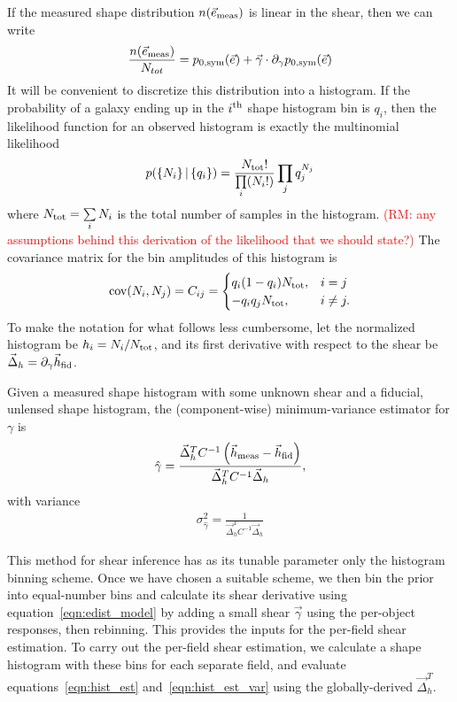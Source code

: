 \documentclass[iop]{emulateapj}
\newcommand\rmcomment[1]{\textcolor{red}{(RM: #1)}}
\begin{document}
If the measured shape distribution $n(\vec{e}_{\rm meas})$ is linear
in the shear, then we can write
\begin{align}
\frac{n(\vec{e}_{\rm meas})}{N_{tot}} = p_{0,\rm sym}(\vec{e}) + \vec{\gamma}\cdot \partial_{\gamma} p_{0,\rm sym}(\vec{e})
\end{align}
It will be convenient to discretize this distribution into a
histogram. If the probability of a galaxy ending up in the $i^{\rm
  th}$ shape histogram bin is $q_i$, then the likelihood function for
an observed histogram is exactly the multinomial likelihood
\begin{align}
p( \left\{N_i\right\} |\left\{ q_i\right\} ) = \frac{N_{\rm tot}!}{\prod\limits_i (N_i!)}\prod\limits_j q_j^{N_j}
\label{eqn:multnomial}
\end{align}
where $N_{\rm tot} = \sum\limits_i N_i$ is the total number of samples
in the histogram. \rmcomment{any assumptions behind this derivation of
  the likelihood that we should state?} The covariance matrix for the
bin amplitudes of this histogram is
\begin{align}
{\rm cov}(N_i, N_j) = C_{ij} = \begin{cases}
  q_i(1-q_i)N_{\rm tot}, & i=j \\
  -q_iq_j N_{\rm tot}, & i \neq j.
\end{cases}
\end{align}
To make the notation for what follows less cumbersome, let the
normalized histogram be $h_i = N_i / N_{\rm tot}$, and its first
derivative with respect to the shear be
$\vec{\Delta}_h=\partial_{\gamma}\vec{h}_{\rm fid}$.

Given a measured shape histogram with some unknown shear and a
fiducial, unlensed shape histogram, the (component-wise)
minimum-variance estimator for $\gamma$ is
\begin{align}
\hat{\gamma} = \frac{\vec{\Delta}_h^T C^{-1}\left( \vec{h}_{\rm meas} - \vec{h}_{\rm fid}\right)} {\vec{\Delta}_h^TC^{-1}\vec{\Delta}_h},
\label{eqn:hist_est}
\end{align}
with variance 
\begin{align}
\sigma^2_{\hat{\gamma}} = \frac{1}{\vec{\Delta}_h^TC^{-1}\vec{\Delta}_h}
\label{eqn:hist_est_var}
\end{align}

This method for shear inference has as its tunable parameter only the
histogram binning scheme. Once we have chosen a suitable scheme, we then
bin the prior into equal-number bins and calculate its shear
derivative using equation~\ref{eqn:edist_model} by adding  a
  small shear $\vec{\gamma}$ using the per-object responses, then rebinning. This provides the
  inputs for the per-field shear estimation.  To carry out the per-field shear estimation, we calculate a shape
histogram with these bins for each separate field, and evaluate
equations~\ref{eqn:hist_est} and~\ref{eqn:hist_est_var} using the globally-derived $\vec{\Delta}_h^T$.
\end{document}
